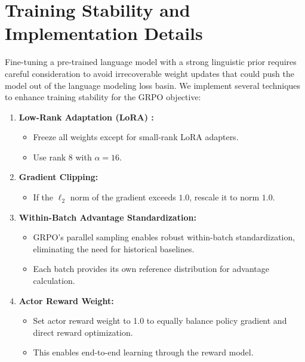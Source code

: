 \documentclass{article} %
\begin{document}
\appendix
\section{Training Stability and Implementation Details}
\label{sec:stability}
Fine-tuning a pre-trained language model with a strong linguistic prior requires careful consideration to avoid irrecoverable weight updates that could push the model out of the language modeling loss basin. We implement several techniques to enhance training stability for the GRPO objective:

\begin{enumerate}
    \item \textbf{Low-Rank Adaptation (LoRA) \citep{hu2022lora}:} 
    \begin{itemize}
        \item Freeze all weights except for small-rank LoRA adapters.
        \item Use rank 8 with $\alpha = 16$.
    \end{itemize}

    \item \textbf{Gradient Clipping:} 
    \begin{itemize}
        \item If the $\ell_2$ norm of the gradient exceeds $1.0$, rescale it to norm $1.0$.
    \end{itemize}

    \item \textbf{Within-Batch Advantage Standardization:} 
    \begin{itemize}
        \item GRPO's parallel sampling enables robust within-batch standardization, eliminating the need for historical baselines.
        \item Each batch provides its own reference distribution for advantage calculation.
    \end{itemize}

    \item \textbf{Actor Reward Weight:} 
    \begin{itemize}
        \item Set actor reward weight to 1.0 to equally balance policy gradient and direct reward optimization.
        \item This enables end-to-end learning through the reward model.
    \end{itemize}


\end{enumerate}
\end{document}
